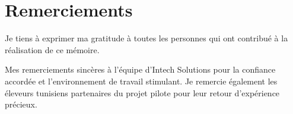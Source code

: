 
\cleardoublepage
\thispagestyle{empty}
\chapter*{Remerciements}
Je tiens à exprimer ma gratitude à toutes les personnes qui ont contribué
à la réalisation de ce mémoire.

Mes remerciements sincères à l'équipe d'Intech Solutions pour la confiance
accordée et l'environnement de travail stimulant. Je remercie également
les éleveurs tunisiens partenaires du projet pilote pour leur retour
d'expérience précieux.

